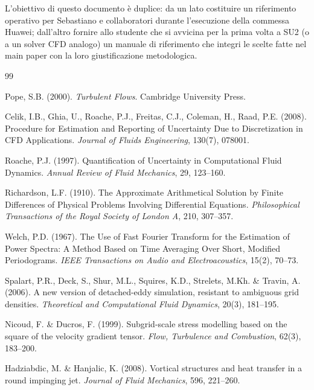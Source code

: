 \documentclass[11pt,a4paper]{article}
\begin{document}
\medskip

L'obiettivo di questo documento è duplice: da un lato costituire un
riferimento operativo per Sebastiano e collaboratori durante l'esecuzione
della commessa Huawei; dall'altro fornire allo studente che si avvicina
per la prima volta a SU2 (o a un solver CFD analogo) un manuale di
riferimento che integri le scelte fatte nel main paper con la loro
giustificazione metodologica.

\newpage
\begin{thebibliography}{99}
\small

  Pope, S.B. (2000).
  \textit{Turbulent Flows}.
  Cambridge University Press.

  Celik, I.B., Ghia, U., Roache, P.J., Freitas, C.J., Coleman, H., Raad, P.E. (2008).
  Procedure for Estimation and Reporting of Uncertainty Due to Discretization in CFD Applications.
  \textit{Journal of Fluids Engineering}, 130(7), 078001.

  Roache, P.J. (1997).
  Quantification of Uncertainty in Computational Fluid Dynamics.
  \textit{Annual Review of Fluid Mechanics}, 29, 123--160.

  Richardson, L.F. (1910).
  The Approximate Arithmetical Solution by Finite Differences of
  Physical Problems Involving Differential Equations.
  \textit{Philosophical Transactions of the Royal Society of London A},
  210, 307--357.

  Welch, P.D. (1967).
  The Use of Fast Fourier Transform for the Estimation of Power
  Spectra: A Method Based on Time Averaging Over Short, Modified
  Periodograms.
  \textit{IEEE Transactions on Audio and Electroacoustics},
  15(2), 70--73.

  Spalart, P.R., Deck, S., Shur, M.L., Squires, K.D., Strelets, M.Kh. \& Travin, A. (2006).
  A new version of detached-eddy simulation, resistant to ambiguous grid densities.
  \textit{Theoretical and Computational Fluid Dynamics}, 20(3), 181--195.

  Nicoud, F. \& Ducros, F. (1999).
  Subgrid-scale stress modelling based on the square of the velocity gradient tensor.
  \textit{Flow, Turbulence and Combustion}, 62(3), 183--200.

  Hadziabdic, M. \& Hanjalic, K. (2008).
  Vortical structures and heat transfer in a round impinging jet.
  \textit{Journal of Fluid Mechanics}, 596, 221--260.


\end{thebibliography}
\end{document}
